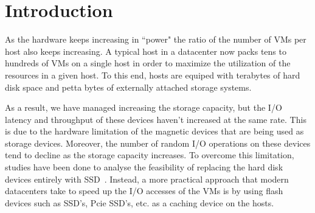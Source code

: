
%
%

\section{Introduction}
As the hardware keeps increasing in ``power" the ratio of the number of VMs per host also keeps increasing. A typical host in a datacenter now packs tens to hundreds of VMs on a single host in order to maximize the utilization of the resources in a given host. To this end, hosts are equiped with terabytes of hard disk space and petta bytes of externally attached storage systems.

As a result, we have managed increasing the storage capacity, but the I/O latency and throughput of these devices haven't increased at the same rate. This is due to the hardware limitation of the magnetic devices that are being used as storage devices. Moreover, the number of random I/O operations on these devices tend to decline as the storage capacity increases. To overcome this limitation, studies have been done to analyse the feasibility of replacing the hard disk devices entirely with SSD~\cite{narayanan_migrating_2009}. Instead, a more practical approach that modern datacenters take to speed up the I/O accesses of the VMs is by using flash devices such as SSD's, Pcie SSD's, etc. as a caching device on the hosts.


